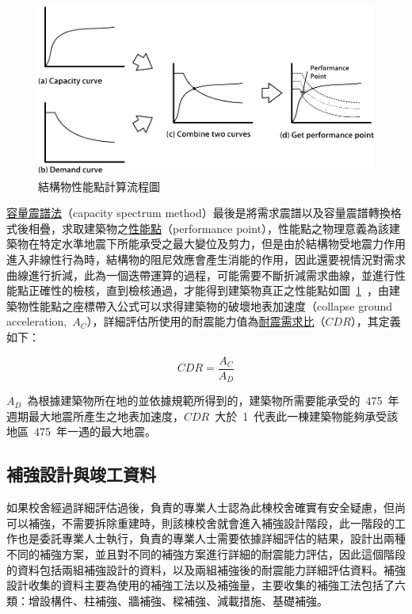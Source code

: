 \begin{figure}[hbtp]
  \begin{center}
    \includegraphics[width=1.0\textwidth]{figures/performance-point.png}
    \caption{結構物性能點計算流程圖}
    \label{fig:performance-point}
  \end{center}
\end{figure}

\underline{容量震譜法}（capacity spectrum method）最後是將需求震譜以及容量震譜轉換格式後相疊，求取建築物之\underline{性能點}（performance point），性能點之物理意義為該建築物在特定水準地震下所能承受之最大變位及剪力，但是由於結構物受地震力作用進入非線性行為時，結構物的阻尼效應會產生消能的作用，因此還要視情況對需求曲線進行折減，此為一個迭帶運算的過程，可能需要不斷折減需求曲線，並進行性能點正確性的檢核，直到檢核通過，才能得到建築物真正之性能點如圖~\ref{fig:performance-point}~，由建築物性能點之座標帶入公式可以求得建築物的破壞地表加速度（collapse ground acceleration,~$A_C$），詳細評估所使用的耐震能力值為\underline{耐震需求比}（$CDR$），其定義如下：

\begin{equation} CDR = \dfrac{A_C}{A_D} \label{eq:CDR}\end{equation} 

$A_D$~為根據建築物所在地的並依據規範所得到的，建築物所需要能承受的~475~年週期最大地震所產生之地表加速度，$CDR$~大於~1~代表此一棟建築物能夠承受該地區~475~年一遇的最大地震。

\subsection{補強設計與竣工資料}

如果校舍經過詳細評估過後，負責的專業人士認為此棟校舍確實有安全疑慮，但尚可以補強，不需要拆除重建時，則該棟校舍就會進入補強設計階段，此一階段的工作也是委託專業人士執行，負責的專業人士需要依據詳細評估的結果，設計出兩種不同的補強方案，並且對不同的補強方案進行詳細的耐震能力評估，因此這個階段的資料包括兩組補強設計的資料，以及兩組補強後的耐震能力詳細評估資料。補強設計收集的資料主要為使用的補強工法以及補強量，主要收集的補強工法包括了六類：增設構件、柱補強、牆補強、樑補強、減載措施、基礎補強。

